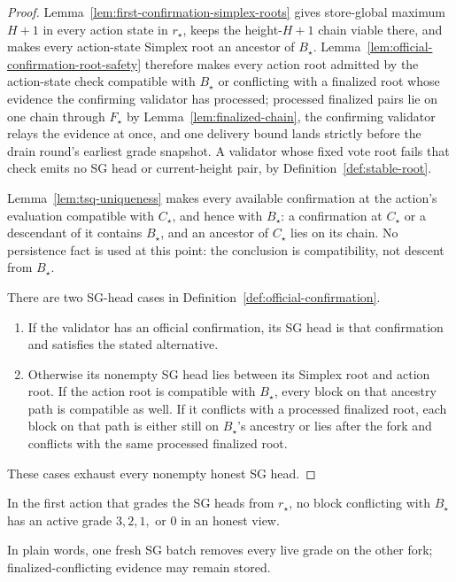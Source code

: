\begin{proof}
Lemma~\ref{lem:first-confirmation-simplex-roots} gives store-global maximum
\(H+1\) in every action state in \(r_\star\), keeps the height-\(H+1\)
chain viable there, and makes every action-state Simplex root an ancestor of
\(B_\star\).  Lemma~\ref{lem:official-confirmation-root-safety} therefore
makes every action root admitted by the action-state check compatible with
\(B_\star\) or conflicting with a finalized root whose evidence the
confirming validator has processed; processed finalized pairs lie on one
chain through \(F_\star\) by Lemma~\ref{lem:finalized-chain}, the
confirming validator relays the evidence at once, and one delivery bound
lands strictly before the drain round's earliest grade snapshot.  A validator whose fixed vote
root fails that check emits no SG head or current-height pair, by
Definition~\ref{def:stable-root}.

Lemma~\ref{lem:tsq-uniqueness} makes every available confirmation at the
action's evaluation compatible with \(C_\star\), and hence with
\(B_\star\): a confirmation at \(C_\star\) or a descendant of it
contains \(B_\star\), and an ancestor of \(C_\star\) lies on its
chain.  No
persistence fact is used at this point: the conclusion is compatibility,
not descent from \(B_\star\).

There are two SG-head cases in
Definition~\ref{def:official-confirmation}.
\begin{enumerate}
 \item If the validator has an official confirmation, its SG head is that
   confirmation and satisfies the stated alternative.
 \item Otherwise its nonempty SG head lies between its Simplex root and
   action root.  If the action root is compatible with \(B_\star\), every
   block on that ancestry path is compatible as well.  If it conflicts
   with a processed finalized root, each block on that path is either
   still on \(B_\star\)'s ancestry or lies after the fork and conflicts
   with the same processed finalized root.
\end{enumerate}
These cases exhaust every nonempty honest SG head.
\end{proof}

\begin{lemma}
\label{lem:first-confirmation-clears}
In the first action that grades the SG heads from \(r_\star\), no block
conflicting with \(B_\star\) has an active grade \(3,2,1,\) or \(0\) in an
honest view.

In plain words, one fresh SG batch removes every live grade on the other
fork; finalized-conflicting evidence may remain stored.
\end{lemma}

